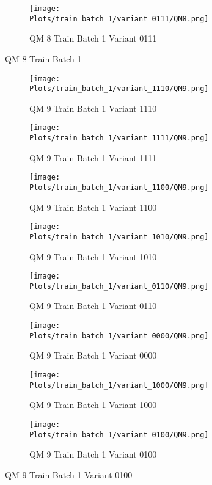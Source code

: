 \documentclass{DissertateFigs}
\begin{document}
\begin{figure}[t!]
\medskip

    \begin{subfigure}{0.38\textwidth}
    \texttt{[image: Plots/train\_batch\_1/variant\_0111/QM8.png]}
    \caption{QM 8 Train Batch 1 Variant 0111}
    \end{subfigure}
\caption{QM 8 Train Batch 1}
    \end{figure}
\clearpage
\begin{figure}[t!]
    \begin{subfigure}{0.47\textwidth}
    \texttt{[image: Plots/train\_batch\_1/variant\_1110/QM9.png]}
    \caption{QM 9 Train Batch 1 Variant 1110}
    \end{subfigure}
    \begin{subfigure}{0.47\textwidth}
    \texttt{[image: Plots/train\_batch\_1/variant\_1111/QM9.png]}
    \caption{QM 9 Train Batch 1 Variant 1111}
    \end{subfigure}

\medskip

    \begin{subfigure}{0.47\textwidth}
    \texttt{[image: Plots/train\_batch\_1/variant\_1100/QM9.png]}
    \caption{QM 9 Train Batch 1 Variant 1100}
    \end{subfigure}
    \begin{subfigure}{0.47\textwidth}
    \texttt{[image: Plots/train\_batch\_1/variant\_1010/QM9.png]}
    \caption{QM 9 Train Batch 1 Variant 1010}
    \end{subfigure}

\medskip

    \begin{subfigure}{0.47\textwidth}
    \texttt{[image: Plots/train\_batch\_1/variant\_0110/QM9.png]}
    \caption{QM 9 Train Batch 1 Variant 0110}
    \end{subfigure}
    \begin{subfigure}{0.47\textwidth}
    \texttt{[image: Plots/train\_batch\_1/variant\_0000/QM9.png]}
    \caption{QM 9 Train Batch 1 Variant 0000}
    \end{subfigure}

\medskip

    \begin{subfigure}{0.47\textwidth}
    \texttt{[image: Plots/train\_batch\_1/variant\_1000/QM9.png]}
    \caption{QM 9 Train Batch 1 Variant 1000}
    \end{subfigure}
    \begin{subfigure}{0.47\textwidth}
    \texttt{[image: Plots/train\_batch\_1/variant\_0100/QM9.png]}
    \caption{QM 9 Train Batch 1 Variant 0100}
    \end{subfigure}


\end{figure}
\end{document}
